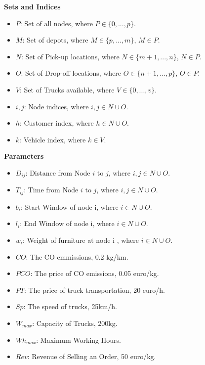 \textbf{Sets and Indices}
\begin{itemize}
  \item $P$: Set of all nodes, where $P \in \{0, ..., p\}$.
  \item $M$: Set of depots, where $M \in \{p, ..., m\}$, $M \in P$.
  \item $N$: Set of Pick-up locations, where $N \in \{m+1, ..., n\}$, $N \in P$.
  \item $O$: Set of Drop-off locations, where $O \in \{n+1, ..., p\}$, $O \in P$.
  \item $V$: Set of Trucks available, where $V \in \{0,..., v\}$.
  \item $i,j$: Node indices, where $i,j \in N \cup O$.
  \item $h$: Customer index, where $h \in N \cup O$.
  \item $k$: Vehicle index, where $k \in V$.
\end{itemize}
\vspace{0.1cm}

\textbf{Parameters}
\begin{itemize}
  \item $D_{ij}$: Distance from Node $i$ to $j$, where $i,j \in N \cup O$.
  \item $T_{ij}$: Time from Node $i$ to $j$, where $i,j \in N \cup O$. 
  \item $b_{i}$: Start Window of node i, where $i \in N \cup O$. 
  \item $l_{i}$: End Window of node i, where $i \in N \cup O$. 
  \item $w_{i}$: Weight of furniture at node i , where $i \in N \cup O$. 
  \item $CO$: The CO emmissions, 0.2 kg/km.
  \item $PCO$: The price of CO emissions, 0.05 euro/kg.
  \item $PT$: The price of truck transportation, 20 euro/h.
  \item $Sp$: The speed of trucks, 25km/h.
  \item $W_{max}$: Capacity of Trucks, 200kg.
  \item $Wh_{max}$: Maximum Working Hours.
  \item $Rev$: Revenue of Selling an Order, 50 euro/kg.

\end{itemize}




\newpage